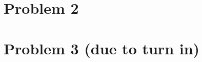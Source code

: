 \documentclass[11pt]{article}
\begin{document}
\newpage
\section{Problem 2}
\label{sec:org6af34a8}

\newpage
\section{Problem 3 (due to turn in)}
\label{sec:orgc5d80d5}
\end{document}
